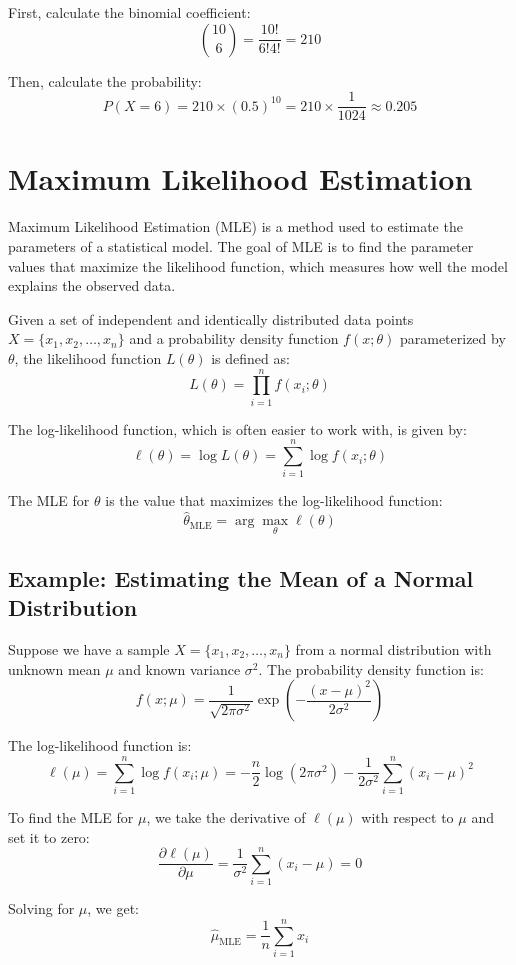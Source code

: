 \documentclass{article}
\begin{document}
First, calculate the binomial coefficient:
\[
\binom{10}{6} = \frac{10!}{6!4!} = 210
\]

Then, calculate the probability:
\[
P(X = 6) = 210 \times (0.5)^{10} = 210 \times \frac{1}{1024} \approx 0.205
\]

\section{Maximum Likelihood Estimation}
Maximum Likelihood Estimation (MLE) is a method used to estimate the parameters of a statistical model. The goal of MLE is to find the parameter values that maximize the likelihood function, which measures how well the model explains the observed data.

Given a set of independent and identically distributed data points \(X = \{x_1, x_2, \ldots, x_n\}\) and a probability density function \(f(x; \theta)\) parameterized by \(\theta\), the likelihood function \(L(\theta)\) is defined as:
\[
L(\theta) = \prod_{i=1}^{n} f(x_i; \theta)
\]

The log-likelihood function, which is often easier to work with, is given by:
\[
\ell(\theta) = \log L(\theta) = \sum_{i=1}^{n} \log f(x_i; \theta)
\]

The MLE for \(\theta\) is the value that maximizes the log-likelihood function:
\[
\hat{\theta}_{\text{MLE}} = \arg \max_{\theta} \ell(\theta)
\]

\subsection{Example: Estimating the Mean of a Normal Distribution}
Suppose we have a sample \(X = \{x_1, x_2, \ldots, x_n\}\) from a normal distribution with unknown mean \(\mu\) and known variance \(\sigma^2\). The probability density function is:
\[
f(x; \mu) = \frac{1}{\sqrt{2\pi\sigma^2}} \exp\left(-\frac{(x - \mu)^2}{2\sigma^2}\right)
\]

The log-likelihood function is:
\[
\ell(\mu) = \sum_{i=1}^{n} \log f(x_i; \mu) = -\frac{n}{2} \log(2\pi\sigma^2) - \frac{1}{2\sigma^2} \sum_{i=1}^{n} (x_i - \mu)^2
\]

To find the MLE for \(\mu\), we take the derivative of \(\ell(\mu)\) with respect to \(\mu\) and set it to zero:
\[
\frac{\partial \ell(\mu)}{\partial \mu} = \frac{1}{\sigma^2} \sum_{i=1}^{n} (x_i - \mu) = 0
\]

Solving for \(\mu\), we get:
\[
\hat{\mu}_{\text{MLE}} = \frac{1}{n} \sum_{i=1}^{n} x_i
\]
\end{document}
